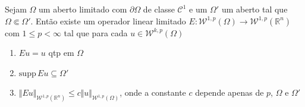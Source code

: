 \documentclass[a4paper, 11pt]{book}
\theoremstyle{definition}
\newcommand{\bR}{\mathbb{R}}
\newcommand{\cC}{\mathcal{C}}
\newcommand{\cW}{\mathcal{W}}
\newcommand{\supp}{\mathrm{supp}\,}
\begin{document}
\begin{tbox} \label{thm:extensao}
    Sejam $\Omega$ um aberto limitado com $\partial\Omega$ de classe $\cC^1$ e um $\Omega'$ um aberto tal que $\Omega \Subset \Omega'$. Então existe um operador linear limitado $E : \cW^{1,p}(\Omega) \to \cW^{1,p}(\bR ^n)$ com $1 \leqslant p < \infty$ tal que para cada $u \in \cW^{k,p}(\Omega)$
    \begin{enumerate}[leftmargin=*, label=\textbf{(\alph*)}]
        \item $Eu = u$ qtp em $\Omega$
        \item $\supp Eu \subseteq \Omega'$
        \item $\Vert Eu \Vert_{\cW^{1,p}(\bR^n)} \leqslant c \Vert u \Vert_{\cW^{1,p}(\Omega)}$, onde a constante $c$ depende apenas de $p$, $\Omega$ e $\Omega'$
    \end{enumerate}
\end{tbox}
\end{document}
